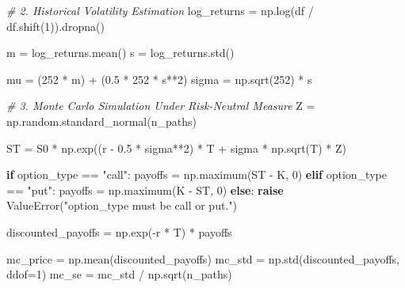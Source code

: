 \documentclass[
  11pt,
]{article}
\newenvironment{Shaded}{}{}
\newcommand{\CommentTok}[1]{\textcolor[rgb]{0.38,0.63,0.69}{\textit{#1}}}
\newcommand{\ControlFlowTok}[1]{\textcolor[rgb]{0.00,0.44,0.13}{\textbf{#1}}}
\newcommand{\DecValTok}[1]{\textcolor[rgb]{0.25,0.63,0.44}{#1}}
\newcommand{\FloatTok}[1]{\textcolor[rgb]{0.25,0.63,0.44}{#1}}
\newcommand{\NormalTok}[1]{#1}
\newcommand{\OperatorTok}[1]{\textcolor[rgb]{0.40,0.40,0.40}{#1}}
\newcommand{\PreprocessorTok}[1]{\textcolor[rgb]{0.74,0.48,0.00}{#1}}
\newcommand{\StringTok}[1]{\textcolor[rgb]{0.25,0.44,0.63}{#1}}
\begin{document}
\begin{Shaded}
\begin{Highlighting}[]
\CommentTok{\# 2. Historical Volatility Estimation}
\NormalTok{log\_returns }\OperatorTok{=}\NormalTok{ np.log(df }\OperatorTok{/}\NormalTok{ df.shift(}\DecValTok{1}\NormalTok{)).dropna()}

\NormalTok{m }\OperatorTok{=}\NormalTok{ log\_returns.mean()}
\NormalTok{s }\OperatorTok{=}\NormalTok{ log\_returns.std()}

\NormalTok{mu }\OperatorTok{=}\NormalTok{ (}\DecValTok{252} \OperatorTok{*}\NormalTok{ m) }\OperatorTok{+}\NormalTok{ (}\FloatTok{0.5} \OperatorTok{*} \DecValTok{252} \OperatorTok{*}\NormalTok{ s}\OperatorTok{**}\DecValTok{2}\NormalTok{)}
\NormalTok{sigma }\OperatorTok{=}\NormalTok{ np.sqrt(}\DecValTok{252}\NormalTok{) }\OperatorTok{*}\NormalTok{ s}

\CommentTok{\# 3. Monte Carlo Simulation Under Risk{-}Neutral Measure}
\NormalTok{Z }\OperatorTok{=}\NormalTok{ np.random.standard\_normal(n\_paths)}

\NormalTok{ST }\OperatorTok{=}\NormalTok{ S0 }\OperatorTok{*}\NormalTok{ np.exp((r }\OperatorTok{{-}} \FloatTok{0.5} \OperatorTok{*}\NormalTok{ sigma}\OperatorTok{**}\DecValTok{2}\NormalTok{) }\OperatorTok{*}\NormalTok{ T }\OperatorTok{+}\NormalTok{ sigma }\OperatorTok{*}\NormalTok{ np.sqrt(T) }\OperatorTok{*}\NormalTok{ Z)}

\ControlFlowTok{if}\NormalTok{ option\_type }\OperatorTok{==} \StringTok{"call"}\NormalTok{:}
\NormalTok{    payoffs }\OperatorTok{=}\NormalTok{ np.maximum(ST }\OperatorTok{{-}}\NormalTok{ K, }\DecValTok{0}\NormalTok{)}
\ControlFlowTok{elif}\NormalTok{ option\_type }\OperatorTok{==} \StringTok{"put"}\NormalTok{:}
\NormalTok{    payoffs }\OperatorTok{=}\NormalTok{ np.maximum(K }\OperatorTok{{-}}\NormalTok{ ST, }\DecValTok{0}\NormalTok{)}
\ControlFlowTok{else}\NormalTok{:}
    \ControlFlowTok{raise} \PreprocessorTok{ValueError}\NormalTok{(}\StringTok{"option\_type must be \textquotesingle{}call\textquotesingle{} or \textquotesingle{}put\textquotesingle{}."}\NormalTok{)}

\NormalTok{discounted\_payoffs }\OperatorTok{=}\NormalTok{ np.exp(}\OperatorTok{{-}}\NormalTok{r }\OperatorTok{*}\NormalTok{ T) }\OperatorTok{*}\NormalTok{ payoffs}

\NormalTok{mc\_price }\OperatorTok{=}\NormalTok{ np.mean(discounted\_payoffs)}
\NormalTok{mc\_std }\OperatorTok{=}\NormalTok{ np.std(discounted\_payoffs, ddof}\OperatorTok{=}\DecValTok{1}\NormalTok{)}
\NormalTok{mc\_se }\OperatorTok{=}\NormalTok{ mc\_std }\OperatorTok{/}\NormalTok{ np.sqrt(n\_paths)}


\end{Highlighting}
\end{Shaded}
\end{document}
